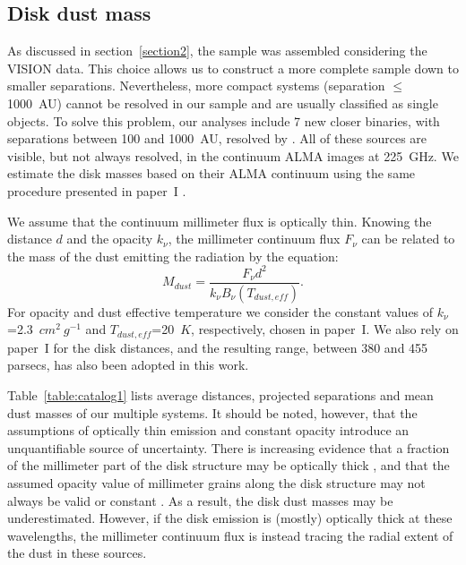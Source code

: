 \documentclass{aa}
\begin{document}
\subsection{Disk dust mass}
As discussed in section~\ref{section2}, the sample was assembled considering the VISION data. This choice allows us to construct a more complete sample down to smaller separations. Nevertheless, more compact systems (separation $\leq$1000~AU) cannot be resolved in our sample and are usually classified as single objects. To solve this problem, our analyses include 7 new closer binaries, with separations between 100 and 1000~AU, resolved by \cite{Kounkel16}. All of these sources are visible, but not always resolved, in the continuum ALMA images at 225~GHz. We estimate the disk masses based on their ALMA continuum using the same procedure presented in paper~I \citep{van_Terwisga_2022}. \par
We assume that the continuum millimeter flux is optically thin. Knowing the distance $d$ and the opacity $k_{\nu}$, the millimeter continuum flux $F_{\nu}$ can be related to the mass of the dust emitting the radiation by the equation:
\begin{equation} \label{equation:3.1}
    M_{dust} = \frac{F_{\nu} d^2}{k_{\nu} B_{\nu}(T_{dust,eff})}.
\end{equation} 
For opacity and dust effective temperature we consider the constant values of $k_{\nu}$=2.3~$cm^2~g^{-1}$ and $T_{dust,eff}$=20~$K$, respectively, chosen in paper~I. We also rely on paper~I for the disk distances, and the resulting range, between 380 and 455 parsecs, has also been adopted in this work. \par
Table~\ref{table:catalog1} lists average distances, projected separations and mean dust masses of our multiple systems. It should be noted, however, that the assumptions of optically thin emission and constant opacity introduce an unquantifiable source of uncertainty. There is increasing evidence that a fraction of the millimeter part of the disk structure may be optically thick \citep[e.g.,][]{Xin23, Zhu19}, and that the assumed opacity value of millimeter grains along the disk structure may not always be valid or constant \citep[e.g.,][]{Krapp22, Macias21, Zhu19}. As a result, the disk dust masses may be underestimated. However, if the disk emission is (mostly) optically thick at these wavelengths, the millimeter continuum flux is instead tracing the radial extent of the dust in these sources.
\end{document}
